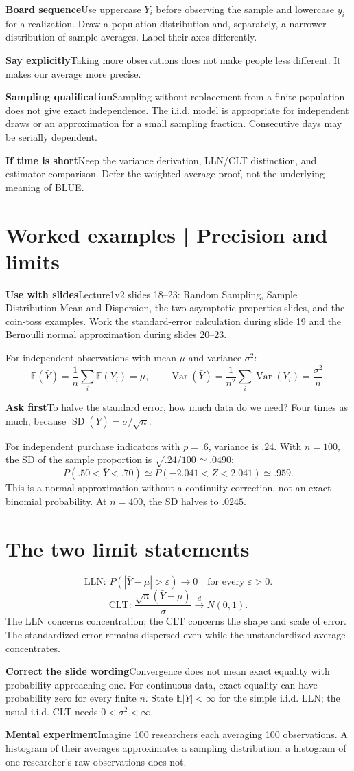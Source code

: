 \documentclass[11pt,a4paper]{article}
\newcommand{\heading}[1]{\section*{\color{accent}#1}}
\newcommand{\cue}[2]{\par\noindent\textbf{#1}\quad #2\par}
\newcommand{\E}{\mathbb{E}}
\newcommand{\Var}{\operatorname{Var}}
\begin{document}
\cue{Board sequence}{Use uppercase $Y_i$ before observing the sample and lowercase $y_i$ for a realization. Draw a population distribution and, separately, a narrower distribution of sample averages. Label their axes differently.}
\cue{Say explicitly}{Taking more observations does not make people less different. It makes our average more precise.}
\cue{Sampling qualification}{Sampling without replacement from a finite population does not give exact independence. The i.i.d. model is appropriate for independent draws or an approximation for a small sampling fraction. Consecutive days may be serially dependent.}
\cue{If time is short}{Keep the variance derivation, LLN/CLT distinction, and estimator comparison. Defer the weighted-average proof, not the underlying meaning of BLUE.}

\newpage
\heading{Worked examples | Precision and limits}
\cue{Use with slides}{Lecture1v2 slides 18--23: Random Sampling, Sample Distribution Mean and Dispersion, the two asymptotic-properties slides, and the coin-toss examples. Work the standard-error calculation during slide 19 and the Bernoulli normal approximation during slides 20--23.}
For independent observations with mean $\mu$ and variance $\sigma^2$:
\[
\E(\bar Y)=\frac1n\sum_i\E(Y_i)=\mu,\qquad
\Var(\bar Y)=\frac1{n^2}\sum_i\Var(Y_i)=\frac{\sigma^2}{n}.
\]
\cue{Ask first}{To halve the standard error, how much data do we need? Four times as much, because $\operatorname{SD}(\bar Y)=\sigma/\sqrt n$.}
For independent purchase indicators with $p=.6$, variance is $.24$. With $n=100$, the SD of the sample proportion is $\sqrt{.24/100}\simeq.0490$:
\[
P(.50<\bar Y<.70)\simeq P(-2.041<Z<2.041)\simeq .959.
\]
This is a normal approximation without a continuity correction, not an exact binomial probability. At $n=400$, the SD halves to $.0245$.
\heading{The two limit statements}
\[
\text{LLN: }P(|\bar Y-\mu|>\varepsilon)\longrightarrow0
\quad\text{for every }\varepsilon>0.
\]
\[
\text{CLT: }\frac{\sqrt n(\bar Y-\mu)}{\sigma}\xrightarrow{d}N(0,1).
\]
The LLN concerns concentration; the CLT concerns the shape and scale of error. The standardized error remains dispersed even while the unstandardized average concentrates.
\cue{Correct the slide wording}{Convergence does not mean exact equality with probability approaching one. For continuous data, exact equality can have probability zero for every finite $n$. State $\E|Y|<\infty$ for the simple i.i.d. LLN; the usual i.i.d. CLT needs $0<\sigma^2<\infty$.}
\cue{Mental experiment}{Imagine 100 researchers each averaging 100 observations. A histogram of their averages approximates a sampling distribution; a histogram of one researcher's raw observations does not.}
\end{document}

